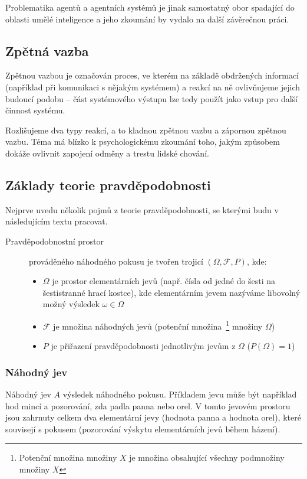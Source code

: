 \documentclass[thesis=M,czech]{FITthesis}[2014/05/07]
\begin{document}
Problematika agentů a agentních systémů je jinak samostatný obor spadající do oblasti umělé inteligence a jeho zkoumání by vydalo na další závěrečnou práci. 

\subsection{Zpětná vazba}
Zpětnou vazbou je označován proces, ve kterém na základě obdržených informací (například při komunikaci s nějakým systémem) a reakcí na ně ovlivňujeme jejich budoucí podobu – část systémového výstupu lze tedy použít jako vstup pro další činnost systému.

Rozlišujeme dva typy reakcí, a to kladnou zpětnou vazbu a zápornou zpětnou vazbu. Téma má blízko k psychologickému zkoumání toho, jakým způsobem dokáže ovlivnit zapojení odměny a trestu lidské chování.

\subsection{Základy teorie pravděpodobnosti}

Nejprve uvedu několik pojmů z teorie pravděpodobnosti, se kterými budu v následujícím textu pracovat.

\begin{description}
	\item[Pravděpodobnostní prostor] prováděného náhodného pokusu je tvořen trojicí $(\Omega,\mathcal{F},P)$, kde:
	\begin{itemize}
		\item $\Omega$ je prostor elementárních jevů (např. čísla od jedné do šesti na šestistranné hrací kostce), kde elementárním jevem nazýváme libovolný možný výsledek $\omega \in \Omega$ 
		\item $\mathcal{F}$ je množina náhodných jevů (potenční množina~\footnote{Potenční množina množiny $X$ je množina obsahující všechny podmnožiny množiny $X$} množiny $\Omega$)
		\item $P$ je přiřazení pravděpodobnosti jednotlivým jevům z $\Omega$ ($P(\Omega)=1$)
	\end{itemize}
\end{description}

\subsubsection{Náhodný jev}
Náhodný jev $A$ výsledek náhodného pokusu. Příkladem jevu může být například hod mincí a pozorování, zda padla panna nebo orel. V tomto jevovém prostoru jsou zahrnuty celkem dva elementární jevy (hodnota panna a hodnota orel), které souvisejí s pokusem (pozorování výskytu elementárních jevů během házení).
\end{document}
